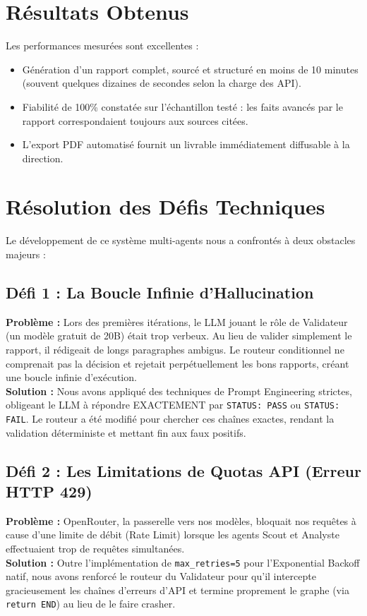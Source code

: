 \documentclass[12pt,a4paper]{report}
\begin{document}
\section{Résultats Obtenus}
Les performances mesurées sont excellentes :
\begin{itemize}
    \item Génération d'un rapport complet, sourcé et structuré en moins de 10 minutes (souvent quelques dizaines de secondes selon la charge des API).
    \item Fiabilité de 100\% constatée sur l'échantillon testé : les faits avancés par le rapport correspondaient toujours aux sources citées.
    \item L'export PDF automatisé fournit un livrable immédiatement diffusable à la direction.
\end{itemize}

\section{Résolution des Défis Techniques}
Le développement de ce système multi-agents nous a confrontés à deux obstacles majeurs :

\subsection{Défi 1 : La Boucle Infinie d'Hallucination}
\textbf{Problème :} Lors des premières itérations, le LLM jouant le rôle de Validateur (un modèle gratuit de 20B) était trop verbeux. Au lieu de valider simplement le rapport, il rédigeait de longs paragraphes ambigus. Le routeur conditionnel ne comprenait pas la décision et rejetait perpétuellement les bons rapports, créant une boucle infinie d'exécution. \\
\textbf{Solution :} Nous avons appliqué des techniques de Prompt Engineering strictes, obligeant le LLM à répondre EXACTEMENT par \texttt{STATUS: PASS} ou \texttt{STATUS: FAIL}. Le routeur a été modifié pour chercher ces chaînes exactes, rendant la validation déterministe et mettant fin aux faux positifs.

\subsection{Défi 2 : Les Limitations de Quotas API (Erreur HTTP 429)}
\textbf{Problème :} OpenRouter, la passerelle vers nos modèles, bloquait nos requêtes à cause d'une limite de débit (Rate Limit) lorsque les agents Scout et Analyste effectuaient trop de requêtes simultanées. \\
\textbf{Solution :} Outre l'implémentation de \texttt{max\_retries=5} pour l'Exponential Backoff natif, nous avons renforcé le routeur du Validateur pour qu'il intercepte gracieusement les chaînes d'erreurs d'API et termine proprement le graphe (via \texttt{return END}) au lieu de le faire crasher.
\end{document}
